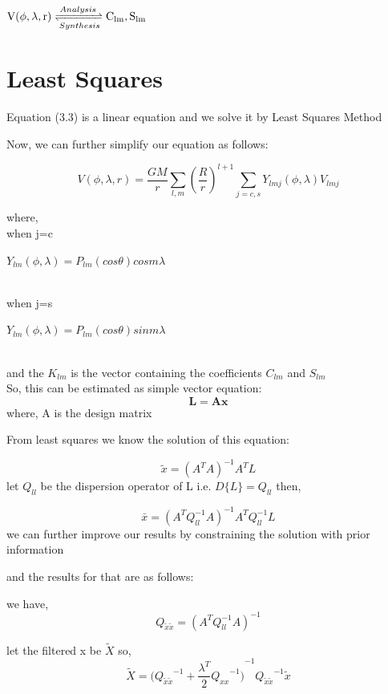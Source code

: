 \documentclass[a4paper,12pt]{report}
\begin{document}
\centerline{
$\mathrm{V(\phi,\lambda,r)} \xrightleftharpoons[Synthesis]{Analysis} \mathrm{C_{lm}, S_{lm}}$
}

\newpage
\chapter{Least Squares}
Equation (3.3) is a linear equation and we solve it by Least Squares Method

Now, we can further simplify our equation as follows:

\begin{equation}
V(\phi,\lambda,r)=\frac{GM}{r}\sum_{l,m}^{} \left(\frac{R}{r}\right)^{l+1}\sum_{j=c,s}^{}  Y_{lmj} (\phi,\lambda) V_{lmj}
\end{equation}

where, \\
 when j=c \centerline{$Y_{lm}(\phi,\lambda)= P_{lm}(cos\theta) cosm\lambda $}\\ 
when j=s \centerline{$Y_{lm} (\phi,\lambda)= P_{lm}(cos\theta) sinm\lambda$
}
\\
and the $K_{lm}$ is the vector containing the coefficients $ C_{lm}$ and $ S_{lm}$
\\ 

So, this can be estimated as simple vector equation:
\begin{equation}
  \mathbf{L} =  \mathbf{Ax}  
\end{equation}
where, A is the design matrix

From least squares we know the solution of this equation:

\begin{equation}
\tilde{x} =(A^T A)^{-1} A^T L
\end{equation}
let $ Q_{ll}$ be the dispersion operator of L i.e. $D\{L\}=Q_{ll}$
then,

\begin{equation}
\bar{x} =(A^T Q_{ll}^{-1} A)^{-1} A^T Q_{ll}^{-1} L
\end{equation}
 we can further improve our results by constraining the solution with prior information
 
 and the results for that are as follows:
 
 we have,
 \begin{equation}
 Q_{\tilde{x}\tilde{x}} = (A^T Q_{ll}^{-1} A)^{-1}
 \end{equation}
 
 let the filtered x be $\widetilde{X}$
 so, 
 \begin{equation}
 \widetilde{X}= {\Bigg( {Q_{\tilde{x}\tilde{x}}}^{-1} + \frac{\lambda^T}{2}{Q_{xx}}^{-1} \Bigg)}^{-1} {Q_{\tilde{x}     \tilde{x}}}^{-1}  \tilde{x}
 \end{equation}
\end{document}
